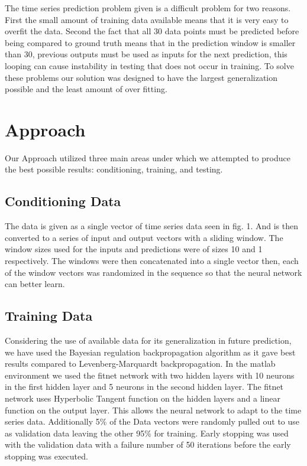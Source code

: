 \documentclass[conference]{IEEEtran}
\begin{document}
The time series prediction problem given is a difficult problem for two reasons. First the small amount of training data available means that it is very easy to overfit the data. Second the fact that all 30 data points must be predicted before being compared to ground truth means that in the prediction window is smaller than 30, previous outputs must be used as inputs for the next prediction, this looping can cause instability in testing that does not occur in training. To solve these problems our solution was designed to have the largest generalization possible and the least amount of over fitting.

\section{Approach}
Our Approach utilized three main areas under which we attempted to produce the best possible results: conditioning, training, and testing.

\subsection{Conditioning Data}
The data is given as a single vector of time series data seen in fig. 1. And is then converted to a series of input and output vectors with a sliding window. The window sizes used for the inputs and predictions were of sizes 10 and 1 respectively. The windows were then concatenated into a single vector then, each of the window vectors was randomized in the sequence so that the neural network can better learn. 

\subsection{Training Data}
Considering the use of available data for its generalization in future prediction, we have used the Bayesian regulation backpropagation algorithm as it gave best results compared to Levenberg-Marquardt backpropagation. In the matlab environment we used the fitnet network with two hidden layers with 10 neurons in the first hidden layer and 5 neurons in the second hidden layer. The fitnet network uses Hyperbolic Tangent function on the hidden layers and a linear function on the output layer. This allows the neural network to adapt to the time series data. Additionally 5\% of the Data vectors were randomly pulled out to use as validation data leaving the other 95\% for training. Early stopping was used with the validation data with a failure number of 50 iterations before the early stopping was executed.
\end{document}
